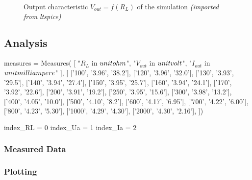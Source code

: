 \begin{figure}[H]
    \centering
    \caption{Output characteristic \textbf{$V_{out} = f(R_L)$} of the simulation \textit{(imported from ltspice)}}
\end{figure}

\subsection{Analysis}

\begin{sagesilent}
    measures = Measures(
        [
            "$R_L$ in $\\unit{\\ohm}$",
            "$V_{out}$ in $\\unit{\\volt}$", 
            "$I_{out}$ in $\\unit{\\milli\\ampere}$"
        ], [
            ['100', '3.96', '38.2'],
            ['120', '3.96', '32.0'],
            ['130', '3.93', '29.5'],
            ['140', '3.94', '27.4'],
            ['150', '3.95', '25.7'],
            ['160', '3.94', '24.1'],
            ['170', '3.92', '22.6'],
            ['200', '3.91', '19.2'],
            ['250', '3.95', '15.6'],
            ['300', '3.98', '13.2'],
            ['400', '4.05', '10.0'],
            ['500', '4.10', '8.2'],
            ['600', '4.17', '6.95'],
            ['700', '4.22', '6.00'],
            ['800', '4.23', '5.30'],
            ['1000', '4.29', '4.30'],
            ['2000', '4.30', '2.16'],
    ])

    index_RL = 0
    index_Ua = 1
    index_Ia = 2
\end{sagesilent}

\subsubsection{Measured Data}

\begin{center}
    \renewcommand{\arraystretch}{1.2}
\end{center}

\subsubsection{Plotting}

